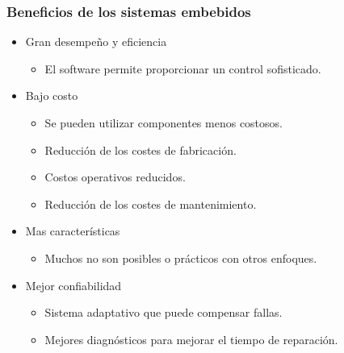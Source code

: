 \documentclass[10.5pt,scale=1.0,t,aspectratio=169,hyperref={pdfpagelabels=false}]{beamer}
\begin{document}
\begin{frame}
	\frametitle{Beneficios de los sistemas embebidos}
	\begin{itemize}
	\item \textcolor{BlueLight}{Gran desempeño y eficiencia} 
		\begin{itemize}
			\item El software permite proporcionar un control sofisticado.
		\end{itemize}
	\item \textcolor{BlueLight}{Bajo costo} 
		\begin{itemize}
			\item Se pueden utilizar componentes menos costosos.
			\item Reducción de los costes de fabricación.
			\item Costos operativos reducidos.
			\item Reducción de los costes de mantenimiento.
		\end{itemize}
	\item \textcolor{BlueLight}{Mas características} 
		\begin{itemize}
			\item Muchos no son posibles o prácticos con otros enfoques.
		\end{itemize}
	\item \textcolor{BlueLight}{Mejor confiabilidad} 
	\begin{itemize}
		\item Sistema adaptativo que puede compensar fallas.
		\item Mejores diagnósticos para mejorar el tiempo de reparación.
	\end{itemize}
\end{itemize}	
\end{frame}
\end{document}
